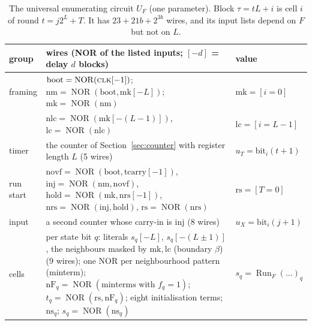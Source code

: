 \documentclass[11pt]{article}
\theoremstyle{definition}
\newcommand{\NOR}{\operatorname{NOR}}
\newcommand{\Run}{\operatorname{Run}}
\begin{document}
\begin{table}[t]
\centering\footnotesize
\begin{tabular}{@{}l@{\ \ }>{\raggedright\arraybackslash}p{10.3cm}@{\ \ }l@{}}
\toprule
group & wires (NOR of the listed inputs; $[-d]$ = delay $d$ blocks) & value\\
\midrule
framing & $\mathrm{boot}=\NOR(\textsc{clk}[-1])$; $\mathrm{nm}=\NOR(\mathrm{boot},\mathrm{mk}[-L])$;
$\mathrm{mk}=\NOR(\mathrm{nm})$ & $\mathrm{mk}=[i=0]$\\
 & $\mathrm{nlc}=\NOR(\mathrm{mk}[-(L-1)])$, $\mathrm{lc}=\NOR(\mathrm{nlc})$ & $\mathrm{lc}=[i=L-1]$\\
timer & the counter of Section~\ref{sec:counter} with register length $L$ (5 wires) & $u_T=\mathrm{bit}_i(t+1)$\\
run start & $\mathrm{novf}=\NOR(\mathrm{boot},\mathrm{tcarry}[-1])$, $\mathrm{inj}=\NOR(\mathrm{nm},\mathrm{novf})$,
$\mathrm{hold}=\NOR(\mathrm{mk},\mathrm{nrs}[-1])$, $\mathrm{nrs}=\NOR(\mathrm{inj},\mathrm{hold})$, $\mathrm{rs}=\NOR(\mathrm{nrs})$ & $\mathrm{rs}=[T=0]$\\
input & a second counter whose carry-in is $\mathrm{inj}$ (8 wires) & $u_X=\mathrm{bit}_i(j+1)$\\
cells & per state bit $q$: literals $s_q[-L]$, $s_q[-(L\pm1)]$, the neighbours masked by $\mathrm{mk},\mathrm{lc}$
(boundary $\beta$) (9 wires); one NOR per neighbourhood pattern (minterm); $\mathrm{nF}_q=\NOR(\text{minterms
with } f_q=1)$; $t_q=\NOR(\mathrm{rs},\mathrm{nF}_q)$; eight initialisation terms; $\mathrm{ns}_q$; $s_q=\NOR(\mathrm{ns}_q)$ &
$s_q=\Run_F(\dots)_q$\\
\bottomrule
\end{tabular}
\caption{The universal enumerating circuit $U_F$ (one parameter).  Block $\tau=tL+i$ is cell $i$ of
round $t=j2^{L}+T$.  It has $23+21b+2^{3b}$ wires, and its input lists depend on $F$ but not on $L$.}
\label{tab:univ}
\end{table}
\end{document}
